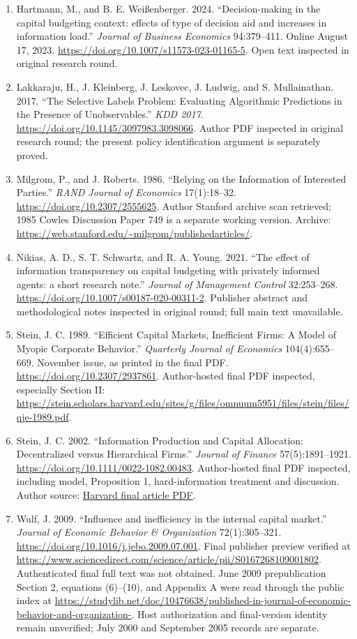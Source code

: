 \documentclass[11pt]{article}
\begin{document}
{\begin{enumerate}
\item Hartmann, M., and B. E. Wei\ss enberger. 2024. ``Decision-making in the capital budgeting context: effects of type of decision aid and increases in information load.'' \emph{Journal of Business Economics} 94:379--411. Online August 17, 2023. \url{https://doi.org/10.1007/s11573-023-01165-5}. Open text inspected in original research round.
\item Lakkaraju, H., J. Kleinberg, J. Leskovec, J. Ludwig, and S. Mullainathan. 2017. ``The Selective Labels Problem: Evaluating Algorithmic Predictions in the Presence of Unobservables.'' \emph{KDD 2017}. \url{https://doi.org/10.1145/3097983.3098066}. Author PDF inspected in original research round; the present policy identification argument is separately proved.
\item Milgrom, P., and J. Roberts. 1986. ``Relying on the Information of Interested Parties.'' \emph{RAND Journal of Economics} 17(1):18--32. \url{https://doi.org/10.2307/2555625}. Author Stanford archive scan retrieved; 1985 Cowles Discussion Paper 749 is a separate working version. Archive: \url{https://web.stanford.edu/~milgrom/publishedarticles/}.
\item Nikias, A. D., S. T. Schwartz, and R. A. Young. 2021. ``The effect of information transparency on capital budgeting with privately informed agents: a short research note.'' \emph{Journal of Management Control} 32:253--268. \url{https://doi.org/10.1007/s00187-020-00311-2}. Publisher abstract and methodological notes inspected in original round; full main text unavailable.
\item Stein, J. C. 1989. ``Efficient Capital Markets, Inefficient Firms: A Model of Myopic Corporate Behavior.'' \emph{Quarterly Journal of Economics} 104(4):655--669. November issue, as printed in the final PDF. \url{https://doi.org/10.2307/2937861}. Author-hosted final PDF inspected, especially Section II: \url{https://stein.scholars.harvard.edu/sites/g/files/omnuum5951/files/stein/files/qje-1989.pdf}.
\item Stein, J. C. 2002. ``Information Production and Capital Allocation: Decentralized versus Hierarchical Firms.'' \emph{Journal of Finance} 57(5):1891--1921. \url{https://doi.org/10.1111/0022-1082.00483}. Author-hosted final PDF inspected, including model, Proposition 1, hard-information treatment and discussion. Author source: \href{https://stein.scholars.harvard.edu/sites/g/files/omnuum5951/files/stein/files/hierarchies-jf-final.pdf}{Harvard final article PDF}.
\item Wulf, J. 2009. ``Influence and inefficiency in the internal capital market.'' \emph{Journal of Economic Behavior \& Organization} 72(1):305--321. \url{https://doi.org/10.1016/j.jebo.2009.07.001}. Final publisher preview verified at \url{https://www.sciencedirect.com/science/article/pii/S0167268109001802}. Authenticated final full text was not obtained. June 2009 prepublication Section 2, equations (6)--(10), and Appendix A were read through the public index at \url{https://studylib.net/doc/10476638/published-in-journal-of-economic-behavior-and-organization-}. Host authorization and final-version identity remain unverified; July 2000 and September 2005 records are separate.

\end{enumerate}}
\end{document}
